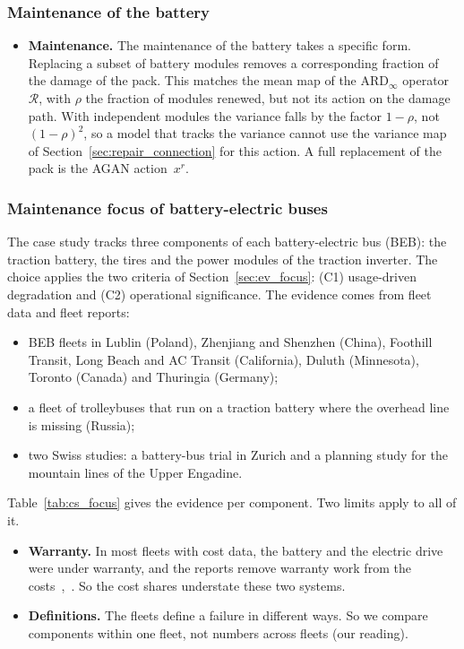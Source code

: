 \documentclass[11pt,a4paper]{article}
\theoremstyle{plain}
\theoremstyle{definition}
\theoremstyle{remark}
\begin{document}
\subsubsection{Maintenance of the battery}
\begin{itemize}
  \item \textbf{Maintenance.}
    The maintenance of the battery takes a specific form.
    Replacing a subset of battery modules removes a corresponding fraction of the damage of the pack.
    This matches the mean map of the $\text{ARD}_\infty$ operator~$\mathcal{R}$, with $\rho$ the fraction of modules renewed, but not its action on the damage path.
    With independent modules the variance falls by the factor $1-\rho$, not $(1-\rho)^2$, so a model that tracks the variance cannot use the variance map of Section~\ref{sec:repair_connection} for this action.
    A full replacement of the pack is the AGAN action~$x^r$.
\end{itemize}

\subsubsection{Maintenance focus of battery-electric buses}\label{sec:cs_focus}

The case study tracks three components of each battery-electric bus (BEB): the traction battery, the tires and the power modules of the traction inverter.
The choice applies the two criteria of Section~\ref{sec:ev_focus}: (C1) usage-driven degradation and (C2) operational significance.
The evidence comes from fleet data and fleet reports:
\begin{itemize}
  \item BEB fleets in Lublin (Poland), Zhenjiang and Shenzhen (China), Foothill Transit, Long Beach and AC Transit (California), Duluth (Minnesota), Toronto (Canada) and Thuringia (Germany);
  \item a fleet of trolleybuses that run on a traction battery where the overhead line is missing (Russia);
  \item two Swiss studies: a battery-bus trial in Zurich and a planning study for the mountain lines of the Upper Engadine.
\end{itemize}
Table~\ref{tab:cs_focus} gives the evidence per component.
Two limits apply to all of it.
\begin{itemize}
  \item \textbf{Warranty.} In most fleets with cost data, the battery and the electric drive were under warranty, and the reports remove warranty work from the costs~\cite[p.~37]{NREL2020LongBeach},~\cite[p.~94]{WorldBank2021Shenzhen}.
    So the cost shares understate these two systems.
  \item \textbf{Definitions.} The fleets define a failure in different ways.
    So we compare components within one fleet, not numbers across fleets (our reading).
\end{itemize}
\end{document}
